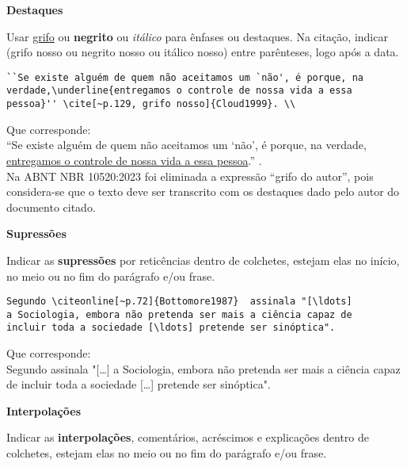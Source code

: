 \begin{alineas}
\item

\textbf{Destaques}

Usar \underline{grifo} ou \textbf{negrito} ou \textit{itálico} para ênfases ou destaques. Na citação, indicar (grifo nosso ou negrito nosso ou itálico nosso) entre parênteses, logo após a data.

\begin{verbatim}
``Se existe alguém de quem não aceitamos um `não', é porque, na 
verdade,\underline{entregamos o controle de nossa vida a essa 
pessoa}'' \cite[~p.129, grifo nosso]{Cloud1999}. \\
\end{verbatim}	

Que corresponde: \\

``Se existe alguém de quem não aceitamos um `não', é porque, na verdade,
\underline{entregamos o controle de nossa vida a essa pessoa}.'' \cite[~p.129, grifo nosso]{Cloud1999}. \\

Na ABNT NBR 10520:2023 foi eliminada a expressão “grifo do autor”, pois considera-se que o texto deve ser transcrito com os destaques dado pelo autor do documento citado.

\item

\textbf{Supressões}

Indicar as \textbf{supressões} por reticências dentro de colchetes, estejam elas no início, no meio ou no fim do parágrafo e/ou frase.

\begin{verbatim}
Segundo \citeonline[~p.72]{Bottomore1987}  assinala "[\ldots]  
a Sociologia, embora não pretenda ser mais a ciência capaz de 
incluir toda a sociedade [\ldots] pretende ser sinóptica".
\end{verbatim}

Que corresponde:\\

Segundo   assinala "[\ldots]  a Sociologia, embora não pretenda ser mais a ciência capaz de incluir toda a sociedade [\ldots] pretende ser sinóptica".\\ 

\item

\textbf{Interpolações}

Indicar as \textbf{interpolações}, comentários, acréscimos e explicações dentro de colchetes, estejam elas no meio ou no fim do parágrafo e/ou frase.


\end{alineas}
